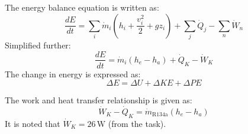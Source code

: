 The energy balance equation is written as:  
\[
\frac{dE}{dt} = \sum_i \dot{m}_i \left( h_i + \frac{v_i^2}{2} + g z_i \right) + \sum_j \dot{Q}_j - \sum_n \dot{W}_n
\]  
Simplified further:  
\[
\frac{dE}{dt} = \dot{m}_i \left( h_e - h_a \right) + \dot{Q}_K - \dot{W}_K
\]  
The change in energy is expressed as:  
\[
\Delta E = \Delta U + \Delta KE + \Delta PE
\]  

The work and heat transfer relationship is given as:  
\[
\dot{W}_K - \dot{Q}_K = \dot{m}_{\text{R134a}} \left( h_e - h_a \right)
\]  
It is noted that \( \dot{W}_K = 26 \, \text{W} \) (from the task).